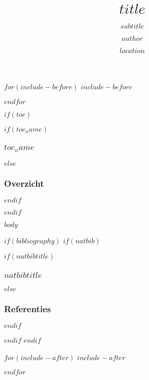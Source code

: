 \documentclass[$if(fontsize)$$fontsize$$else$10pt$endif$, $if(handout)$handout,$endif$ xetex, noamsthm]{beamer}
\title{$title$}
\subtitle{$subtitle$}
\author{$author$}
\institute{$institute$}
\date{$location$}
\date{}
\begin{document}
\begin{frame}[plain, label=intro, noframenumbering]
  \titlepage
\end{frame}

$for(include-before)$
$include-before$

$endfor$

$if(toc)$
\begin{frame}
$if(toc_name)$
  \frametitle{$toc_name$}
$else$
  \frametitle{Overzicht}
$endif$
	\tableofcontents
\end{frame}
$endif$


$body$


$if(bibliography)$
$if(natbib)$
\begin{frame}[allowframebreaks]
$if(natbibtitle)$
\frametitle{$natbibtitle$}
$else$
\frametitle{Referenties}
$endif$


\end{frame}
$endif$
$endif$

$for(include-after)$
$include-after$

$endfor$
\end{document}
